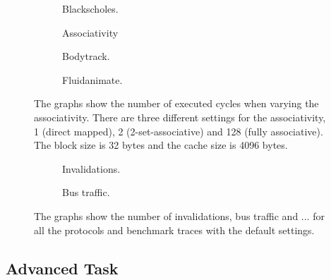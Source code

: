 \begin{figure}[H]
    \centering
    \begin{subfigure}[b]{0.33\textwidth}
        \centering
        \caption{Blackscholes.}\label{fig:associativity_blackscholes}
    \end{subfigure}%
    \hfill
    \begin{subfigure}[b]{0.33\textwidth}
        \centering
        Associativity\par\medskip
        \caption{Bodytrack.}\label{fig:associativity_bodytrack}
    \end{subfigure}%
    \hfill
    \begin{subfigure}[b]{0.33\textwidth}
        \centering
        \caption{Fluidanimate.}\label{fig:associativity_fluidanimate}
    \end{subfigure}
    \hfill
    \caption{The graphs show the number of executed cycles when varying the associativity. There are three different settings for the associativity, 1 (direct mapped), 2 (2-set-associative) and 128 (fully associative). The block size is 32 bytes and the cache size is 4096 bytes.}\label{fig:associativity}
\end{figure}

\begin{figure}[H]
    \centering
    \begin{subfigure}[b]{0.33\textwidth}
        \centering
        \caption{Invalidations.}\label{fig:invalidations}
    \end{subfigure}%
    \hfill
    \begin{subfigure}[b]{0.33\textwidth}
        \centering
        \caption{Bus traffic.}\label{fig:bus_traffic}
    \end{subfigure}%
    \hfill
    \begin{subfigure}[b]{0.33\textwidth}
        \centering
        \caption{}\label{fig:}
    \end{subfigure}
    \hfill
    \caption{The graphs show the number of invalidations, bus traffic and ... for all the protocols and benchmark traces with the default settings.}\label{fig:}
\end{figure}

\subsection{Advanced Task}\label{results:advanced}


